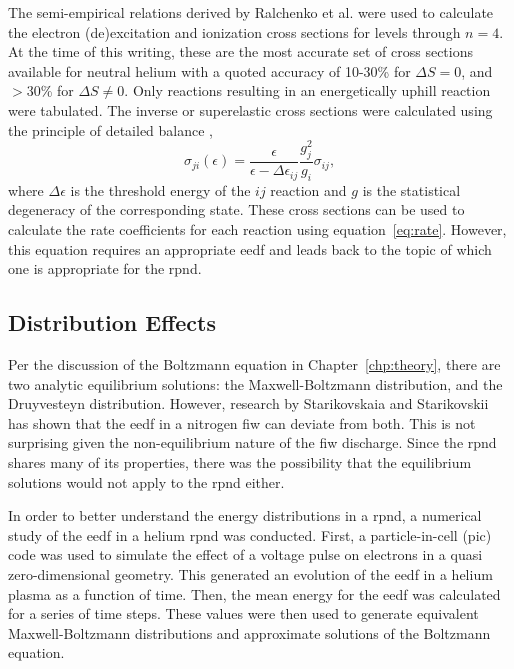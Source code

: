 The semi-empirical relations derived by Ralchenko et al. \cite{Ralchenko2008}
were used to calculate the electron (de)excitation and ionization cross sections
for levels through $n=4$. At the time of this writing, these are the most
accurate set of cross sections available for neutral helium with a quoted
accuracy of 10-30\% for $\Delta S=0$, and $>30$\% for $\Delta S \neq 0$. Only
reactions resulting in an energetically uphill reaction were tabulated. The
inverse or superelastic cross sections were calculated using the principle of
detailed balance \cite{Kunze2009},
\begin{equation}
  \sigma_{ji}(\epsilon) = \frac{\epsilon}{\epsilon - \Delta\epsilon_{ij}}
    \frac{g_j^2}{g_i}\sigma_{ij},
\end{equation}
where $\Delta\epsilon$ is the threshold energy of the $ij$ reaction and $g$ is
the statistical degeneracy of the corresponding state. These cross sections can
be used to calculate the rate coefficients for each reaction using
equation~\ref{eq:rate}. However, this equation requires an appropriate
\acs{eedf} and leads back to the topic of which one is appropriate for the
\acs{rpnd}.

\subsection{Distribution Effects}\label{sec:dists}

Per the discussion of the Boltzmann equation in Chapter~\ref{chp:theory}, there
are two analytic equilibrium solutions: the Maxwell-Boltzmann distribution, and
the Druyvesteyn distribution. However, research by Starikovskaia and
Starikovskii \cite{Starikovskaia2001a} has shown that the \acs{eedf} in a
nitrogen \acs{fiw} can deviate from both. This is not surprising given the
non-equilibrium nature of the \acs{fiw} discharge. Since the \acs{rpnd} shares
many of its properties, there was the possibility that the equilibrium solutions
would not apply to the \acs{rpnd} either.

In order to better understand the energy distributions in a \acs{rpnd}, a
numerical study of the \acs{eedf} in a helium \acs{rpnd} was conducted. First, a
particle-in-cell (\acs{pic}) code was used to simulate the effect of a voltage
pulse on electrons in a quasi zero-dimensional geometry. This generated an
evolution of the \acs{eedf} in a helium plasma as a function of time. Then, the
mean energy for the \acs{eedf} was calculated for a series of time steps. These
values were then used to generate equivalent Maxwell-Boltzmann distributions and
approximate solutions of the Boltzmann equation.

